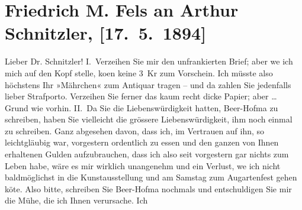 

               \section[Friedrich M. Fels an Arthur Schnitzler, {[}17. 5. 1894{]}]{ Friedrich M. Fels an Arthur Schnitzler, {[}17. 5. 1894{]}}\nopagebreak{}\rehead{ }\begin{ledgroupsized}[t]{13cm}\normalsize\beginnumbering{} \toendnotes[C]{\smallbreak\pagebreak[2]} 
\toendnotes[C]{\smallbreak}\pstart{}{\pb}Lieber Dr. Schnitzler!\pend\pstart
           I. Verzeihen Sie mir den unfrankierten Brief; aber we{\geminationn} ich mich auf den Kopf stelle, ko{\geminationm}en keine 3 Kr
                    zum Vorschein. Ich müsste also höchstens Ihr »Mährchen« zum Antiquar tragen – und da zahlen Sie jedenfalls lieber
                    Strafporto. Verzeihen Sie ferner das kaum recht dicke Papier; aber {\dots} Grund wie vorhin.\pend
           \pstart
           II. Da Sie die Liebenswürdigkeit hatten, Beer-Hofma{\geminationn} zu schreiben, haben Sie vielleicht die grössere Liebenswürdigkeit, ihm
                    noch einmal zu schreiben. Ganz abgesehen davon, dass ich, im Vertrauen auf ihn,
                    so leichtgläubig war, vorgestern ordentlich zu essen und den ganzen von Ihnen
                    erhaltenen Gulden aufzubrauchen, dass ich also seit vorgestern gar nichts zum
                    Leben habe, wäre es mir wirklich unangenehm und ein Verlust, we{\geminationn} ich nicht baldmöglichst in die Kunstausstellung
                    und am Samstag zum Augartenfest
                    gehen kö{\geminationn}te. Also bitte, schreiben Sie Beer-Hofma{\geminationn} nochmals und entschuldigen Sie mir die Mühe, die ich Ihnen verursache. Ich

\end{ledgroupsized}
